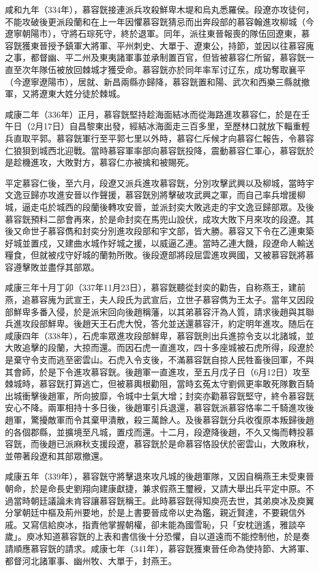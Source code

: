 咸和九年（334年），慕容皝接連派兵攻殺鮮卑木堤和烏丸悉羅侯。段遼亦攻徒何，不能攻破後更派段蘭和在上一年因懼慕容皝猜忌而出奔段部的慕容翰進攻柳城（今遼寧朝陽市），守將石琮死守，終於退軍。同年，派往東晉報喪的隊伍回遼東，慕容皝獲東晉授予鎮軍大將軍、平州刺史、大單于、遼東公，持節，並因以往慕容廆之事，都督幽、平二州及東夷諸軍事並承制置百官，但皆被慕容仁所留，慕容皝一直至次年隊伍被放回棘城才獲受命。慕容皝亦於同年率军讨辽东，成功奪取襄平（今遼寧遼陽市），居就、新昌兩縣亦歸降，慕容皝置和陽、武次和西樂三縣就撤軍，又將遼東大姓分徒於棘城。

咸康二年（336年）正月，慕容皝堅持趁海面結冰而從海路進攻慕容仁，於是在壬午日（2月17日）自昌黎東出發，經結冰海面走三百多里，至歷林口就放下輜重輕兵直取平郭。慕容皝軍行至平郭七里以外時，慕容仁斥候才向慕容仁報告，令慕容仁狼狽到城西北迎戰。當時慕容軍率部向慕容皝投降，震動慕容仁軍心，慕容皝於是趁機進攻，大敗對方，慕容仁亦被擒和被賜死。

平定慕容仁後，至六月，段遼又派兵進攻慕容皝，分別攻擊武興以及柳城，當時宇文逸豆歸亦攻進安晉以作聲援，慕容皝別將擊破攻武興之軍，而自己率兵增援柳城，逼走屯於城西的段蘭後轉攻安晉，並派封奕大敗逃走的宇文逸豆歸部眾。及後慕容皝預料二部會再來，於是命封奕在馬兜山設伏，成攻大敗下月來攻的段遼。其後又命世子慕容儁和封奕分別進攻段部和宇文部，皆大勝。慕容又下令在乙連東築好城並置戍，又建曲水城作好城之援，以威逼乙連。當時乙連大饑，段遼命人輸送糧食，但就被戍守好城的蘭勃所敗。後段遼部將段屈雲進攻興國，又被慕容皝將慕容遵擊敗並盡俘其部眾。

咸康三年十月丁卯（337年11月23日），慕容皝聽從封奕的勸告，自称燕王，建前燕，追慕容廆为武宣王，夫人段氏为武宣后，立世子慕容儁为王太子。當年又因段部鮮卑多番入侵，於是派宋回向後趙稱藩，以其弟慕容汗為人質，請求後趙與其聯兵進攻段部鮮卑。後趙天王石虎大悅，答允並送還慕容汗，約定明年進攻。随后在咸康四年（338年），石虎率眾進攻段部鮮卑，慕容皝則出兵進掠令支以北諸城，並大敗追擊的段蘭，大掠而還。而因石虎一直進攻，四十多座城被石虎所得，段遼於是棄守令支而逃至密雲山。石虎入令支後，不滿慕容皝自掠人民牲畜後回軍，不與其會師，於是下令進攻慕容皝。後趙軍一直進攻，至五月戊子日（6月12日）攻至棘城時，慕容皝打算逃亡，但被慕輿根勸阻，當時玄菟太守劉佩更率敢死隊數百騎出城衝擊後趙軍，所向披靡，令城中士氣大增；封奕亦勸慕容皝堅守，終令慕容皝安心不降。兩軍相持十多日後，後趙軍引兵退還，慕容皝派慕容恪率二千騎進攻後趙軍，驚擾敵軍而令其棄甲潰散，殺三萬餘人。及後慕容皝分兵收復原本叛歸後趙的各個郡縣，並擴境至凡城，置戍而還。十二月，段遼降後趙，不久又悔而轉投慕容皝，而後趙已派麻秋支援段遼，慕容皝於是命慕容恪設伏於密雲山，大敗麻秋，並帶著段遼和其部眾撤還。

咸康五年（339年），慕容皝守將擊退來攻凡城的後趙軍隊，又因自稱燕王未受東晉朝命，於是命長史劉翔向建康獻捷，兼求假燕王璽綬，又請大舉出兵平定中原。不過當時朝廷議論未肯容讓慕容皝稱王。此時慕容皝得知庾亮去世，其弟庾冰及庾翼分掌朝廷中樞及荊州要地，於是上書要晉成帝以史為鑑，親近賢達，不要親信外戚。又寫信給庾冰，指責他掌握朝權，卻未能為國雪恥，只「安枕逍遙，雅談卒歲」。庾冰知道慕容皝的上表和書信後十分恐懼，自以道遠而不能控制他，於是奏請順應慕容皝的請求。咸康七年（341年），慕容皝獲東晉任命為使持節、大將軍、都督河北諸軍事、幽州牧、大單于，封燕王。

